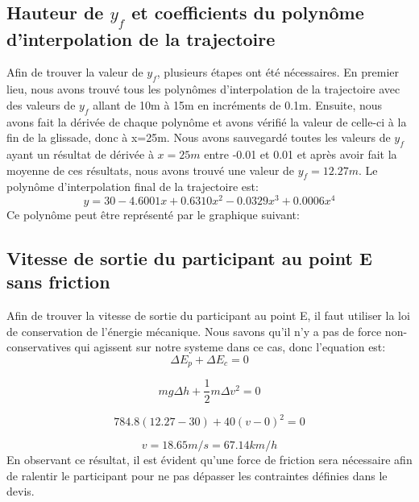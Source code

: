 \documentclass{article}
\begin{document}
\subsection{Hauteur de $y_f$ et coefficients du polynôme d'interpolation de la trajectoire}
Afin de trouver la valeur de $y_f$, plusieurs étapes ont été nécessaires. En premier lieu, nous avons trouvé tous les polynômes d'interpolation de la trajectoire avec des valeurs de $y_f$ allant de 10m à 15m en incréments de 0.1m. Ensuite, nous avons fait la dérivée de  chaque polynôme et avons vérifié la valeur de celle-ci à la fin de la glissade, donc à x=25m. Nous avons sauvegardé toutes les valeurs de $y_f$ ayant un résultat de dérivée à $x=25m$ entre -0.01 et 0.01 et après avoir fait la moyenne de ces résultats, nous avons trouvé une valeur de $y_f=12.27m$. Le polynôme d'interpolation final de la trajectoire est:
\begin{equation}
y = 30-4.6001x+0.6310x^2-0.0329x^3+0.0006x^4
\end{equation}
Ce polynôme peut être représenté par le graphique suivant:
\begin{center}
\end{center}

\subsection{Vitesse de sortie du participant au point E sans friction}
Afin de trouver la vitesse de sortie du participant au point E, il faut utiliser la loi de conservation de l'énergie mécanique. Nous savons qu'il n'y a pas de force non-conservatives qui agissent sur notre systeme dans ce cas, donc l'equation est:
\begin{equation}
	\Delta E_p + \Delta E_c = 0
\end{equation}

\begin{equation}
	mg\Delta h + \frac{1}{2}m\Delta v^2 = 0
\end{equation}

\begin{equation}
	784.8(12.27-30) + 40(v-0)^2 = 0
\end{equation}

\begin{equation}
	v = 18.65 m/s = 67.14 km/h
\end{equation}
En observant ce résultat, il est évident qu'une force de friction sera nécessaire afin de ralentir le participant pour ne pas dépasser les contraintes définies dans le devis.
\end{document}
